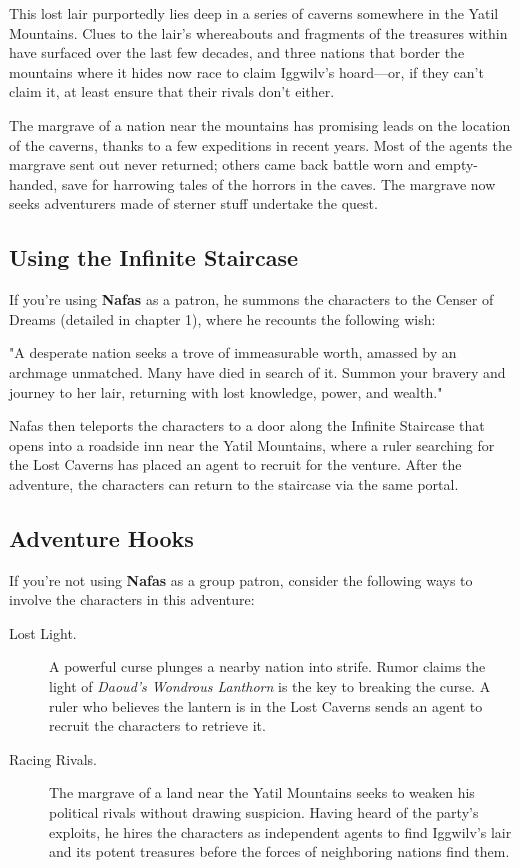 \documentclass[10pt,a4paper,twoside,bg=print,twocolumn,openany,nodeprecatedcode]{dndbook}
\begin{document}
This lost lair purportedly lies deep in a series of caverns somewhere in the Yatil Mountains. Clues to the lair's whereabouts and fragments of the treasures within have surfaced over the last few decades, and three nations that border the mountains where it hides now race to claim Iggwilv's hoard—or, if they can't claim it, at least ensure that their rivals don't either.

The margrave of a nation near the mountains has promising leads on the location of the caverns, thanks to a few expeditions in recent years. Most of the agents the margrave sent out never returned; others came back battle worn and empty-handed, save for harrowing tales of the horrors in the caves. The margrave now seeks adventurers made of sterner stuff undertake the quest.

\subsection{Using the Infinite Staircase}
If you're using \textbf{Nafas} as a patron, he summons the characters to the Censer of Dreams (detailed in chapter 1), where he recounts the following wish:

\begin{DndReadAloud}{}
"A desperate nation seeks a trove of immeasurable worth, amassed by an archmage unmatched. Many have died in search of it. Summon your bravery and journey to her lair, returning with lost knowledge, power, and wealth."

\end{DndReadAloud}

Nafas then teleports the characters to a door along the Infinite Staircase that opens into a roadside inn near the Yatil Mountains, where a ruler searching for the Lost Caverns has placed an agent to recruit for the venture. After the adventure, the characters can return to the staircase via the same portal.

\subsection{Adventure Hooks}
If you're not using \textbf{Nafas} as a group patron, consider the following ways to involve the characters in this adventure:


\begin{description}
\item[Lost Light.]
A powerful curse plunges a nearby nation into strife. Rumor claims the light of \textit{Daoud's Wondrous Lanthorn} is the key to breaking the curse. A ruler who believes the lantern is in the Lost Caverns sends an agent to recruit the characters to retrieve it.
\item[Racing Rivals.]
The margrave of a land near the Yatil Mountains seeks to weaken his political rivals without drawing suspicion. Having heard of the party's exploits, he hires the characters as independent agents to find Iggwilv's lair and its potent treasures before the forces of neighboring nations find them.
\end{description}
\end{document}
